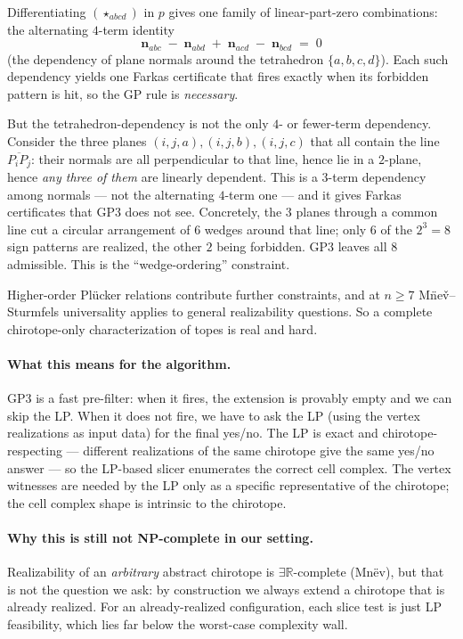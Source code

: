 \documentclass[11pt]{article}
\begin{document}
Differentiating $(\star_{abcd})$ in $p$ gives one family of linear-part-zero
combinations: the alternating $4$-term identity
\[
\mathbf{n}_{abc} \;-\; \mathbf{n}_{abd} \;+\; \mathbf{n}_{acd} \;-\; \mathbf{n}_{bcd} \;=\; 0
\]
(the dependency of plane normals around the tetrahedron $\{a,b,c,d\}$). Each
such dependency yields one Farkas certificate that fires exactly when its
forbidden pattern is hit, so the GP rule is \emph{necessary}.

But the tetrahedron-dependency is not the only $4$- or fewer-term
dependency. Consider the three planes $(i,j,a), (i,j,b), (i,j,c)$ that all
contain the line $\overline{P_iP_j}$: their normals are all perpendicular to
that line, hence lie in a $2$-plane, hence \emph{any three of them} are
linearly dependent. This is a $3$-term dependency among normals --- not the
alternating $4$-term one --- and it gives Farkas certificates that GP3 does
not see. Concretely, the $3$ planes through a common line cut a circular
arrangement of $6$ wedges around that line; only $6$ of the $2^3=8$ sign
patterns are realized, the other $2$ being forbidden. GP3 leaves all
$8$ admissible. This is the ``wedge-ordering'' constraint.

Higher-order Pl\"ucker relations contribute further constraints, and at
$n\ge 7$ M\"ne\v{v}--Sturmfels universality applies to general realizability
questions. So a complete chirotope-only characterization of topes is real
and hard.

\paragraph{What this means for the algorithm.} GP3 is a fast pre-filter:
when it fires, the extension is provably empty and we can skip the LP.
When it does not fire, we have to ask the LP (using the vertex
realizations as input data) for the final yes/no. The LP is exact and
chirotope-respecting --- different realizations of the same chirotope
give the same yes/no answer --- so the LP-based slicer enumerates the
correct cell complex. The vertex witnesses are needed by the LP only as a
specific representative of the chirotope; the cell complex shape is
intrinsic to the chirotope.

\paragraph{Why this is still not NP-complete in our setting.} Realizability
of an \emph{arbitrary} abstract chirotope is $\exists\mathbb{R}$-complete
(Mn\"ev), but that is not the question we ask: by construction we always
extend a chirotope that is already realized. For an already-realized
configuration, each slice test is just LP feasibility, which lies far
below the worst-case complexity wall.
\end{document}

